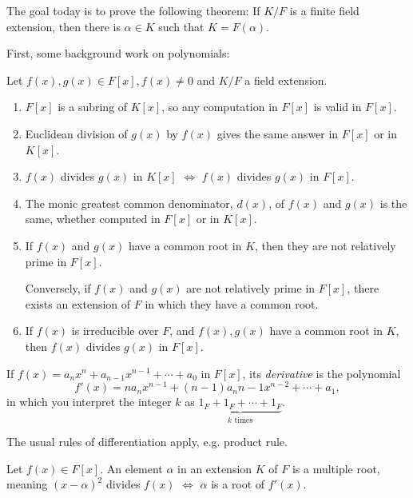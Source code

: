 
The goal today is to prove the following theorem:	If $K / F$ is a finite field extension, then there is $\alpha \in K$ such that $K = F(\alpha)$.

First, some background work on polynomials:
\begin{prop}
	Let $f(x), g(x) \in F[x], f(x) \neq 0$ and $K/F$ a field extension. 
	\begin{enumerate}[label = (\alph*)]
		\item $F[x]$ is a subring of $K[x]$, so any computation in  $F[x]$ is valid in $F[x]$. 
		\item Euclidean division of $g(x)$ by $f(x)$ gives the same answer in $F[x]$ or in  $K[x]$.
		\item $f(x)$ divides $g(x)$ in $K[x]$ $\iff$  $f(x)$ divides $g(x)$ in $F[x]$.
		\item The monic greatest common denominator, $d(x)$, of $f(x)$ and $g(x)$ is the same, whether computed in $F[x]$ or in $K[x]$.
		\item If $f(x)$ and $g(x)$ have a common root in $K$, then they are not relatively prime in $F[x]$.

			Conversely, if $f(x)$ and $g(x)$ are not relatively prime in $F[x]$, there exists an extension of  $F$ in which they have a common root.
		\item If $f(x)$ is irreducible over $F$, and $f(x), g(x)$ have a common root in $K$, then $f(x)$ divides $g(x)$ in $F[x]$.
	\end{enumerate}
\end{prop}

\begin{defn}[Derivative]
	If $f(x) = a_nx^n + a_{n-1}x^{n-1} + \cdots + a_0$ in $F[x]$, its \emph{derivative} is the polynomial \[
		f'(x) = na_nx^{n-1} + (n-1)a_n{n-1}x^{n-2} + \cdots + a_1,
	\]
	in which you interpret the integer $k$ as $\underbrace{1_F + 1_F + \cdots + 1_F}_\text{$k$ times}$.
\end{defn}

\begin{lem}
	The usual rules of differentiation apply, e.g. product rule.
\end{lem}

\begin{lem}
	Let $f(x) \in F[x]$. An element $\alpha$ in an extension $K$ of $F$ is a multiple root, meaning $(x - \alpha)^2$ divides $f(x)$ $\iff$ $\alpha$ is a root of $f'(x)$. 	
\end{lem}

